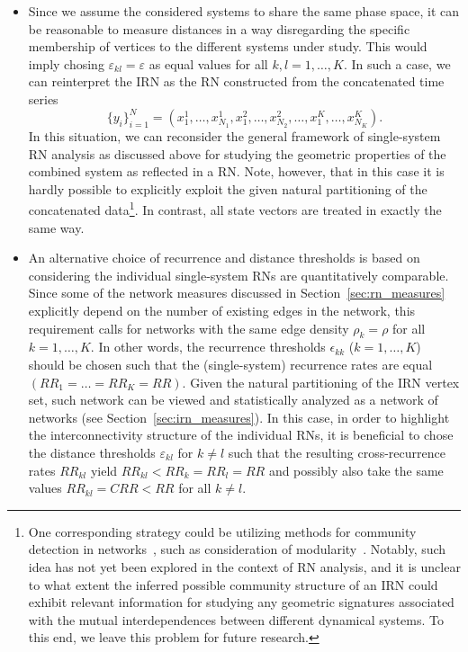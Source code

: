 \documentclass[graybox]{svmult}
\begin{document}
\begin{itemize}

\item Since we assume the considered systems to share the same phase space, it can be reasonable to measure distances in a way disregarding the specific membership of vertices to the different systems under study. This would imply chosing $\varepsilon_{kl}=\varepsilon$ as equal values for all $k,l=1,\dots,K$. In such a case, we can reinterpret the IRN as the RN constructed from the concatenated time series 
$$\{y_i\}_{i=1}^N=(x_1^1,\dots,x_{N_1}^1,x_1^2,\dots,x_{N_2}^2,\dots,x_1^K,\dots,x_{N_K}^K).$$ 
In this situation, we can reconsider the general framework of single-system RN analysis as discussed above for studying the geometric properties of the combined system as reflected in a RN. Note, however, that in this case it is hardly possible to explicitly exploit the given natural partitioning of the concatenated data\footnote{One corresponding strategy could be utilizing methods for community detection in networks~\cite{Fortunato2010}, such as consideration of modularity~\cite{Newman2004}. Notably, such idea has not yet been explored in the context of RN analysis, and it is unclear to what extent the inferred possible community structure of an IRN could exhibit relevant information for studying any geometric signatures associated with the mutual interdependences between different dynamical systems. To this end, we leave this problem for future research.}. In contrast, all state vectors are treated in exactly the same way.

\item An alternative choice of recurrence and distance thresholds is based on considering the individual single-system RNs are quantitatively comparable. Since some of the network measures discussed in Section~\ref{sec:rn_measures} explicitly depend on the number of existing edges in the network, this requirement calls for networks with the same edge density $\rho_k=\rho$ for all $k=1,\dots,K$. In other words, the recurrence thresholds $\epsilon_{kk}$ ($k=1,\dots,K$) should be chosen such that the (single-system) recurrence rates are equal $(RR_1=\dots=RR_K=RR)$. Given the natural partitioning of the IRN vertex set, such network can be viewed and statistically analyzed as a network of networks (see Section~\ref{sec:irn_measures}). In this case, in order to highlight the interconnectivity structure of the individual RNs, it is beneficial to chose the distance thresholds $\varepsilon_{kl}$ for $k\neq l$ such that the resulting cross-recurrence rates $RR_{kl}$ yield $RR_{kl}<RR_k=RR_l=RR$ and possibly also take the same values $RR_{kl}=CRR<RR$ for all $k\neq l$.

\end{itemize}
\end{document}
